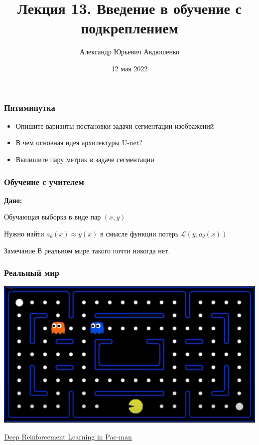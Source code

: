 \documentclass[fullscreen=true, bookmarks=true, hyperref={pdfencoding=unicode}]{beamer}
\title{Лекция 13. Введение в обучение с подкреплением}
\author{Александр Юрьевич Авдюшенко}
\institute{МКН СПбГУ}
\date{12 мая 2022}
\begin{document}

\begin{frame}
\transdissolve[duration=0.2]
\titlepage
\end{frame}


\begin{frame}
  \frametitle{Пятиминутка}
  \begin{itemize}
    \item Опишите варианты постановки задачи сегментации изображений
    \item В чем основная идея архитектуры U-net?
    \item Выпишите пару метрик в задаче сегментации
  \end{itemize}
\end{frame}


\begin{frame}
  \frametitle{Обучение с учителем}

  {\bf Дано:}

  Обучающая выборка в виде пар $(x, y)$

  \vspace{1cm}
  Нужно найти $a_\theta(x) \approx y(x)$ в смысле функции потерь $\mathscr{L}(y, a_\theta(x))$

  \pause
  \vspace{1cm}
  \begin{block}{Замечание}
    В реальном мире такого почти никогда нет.
  \end{block}

\end{frame}


\begin{frame}
  \frametitle{Реальный мир}

  \begin{center}
    \includegraphics[keepaspectratio,
                     width=.8\paperwidth]{pacman.png}

                     \href{https://www.youtube.com/watch?v=QilHGSYbjDQ}{Deep Reinforcement Learning in Pac-man}
  \end{center}

\end{frame}
\end{document}
